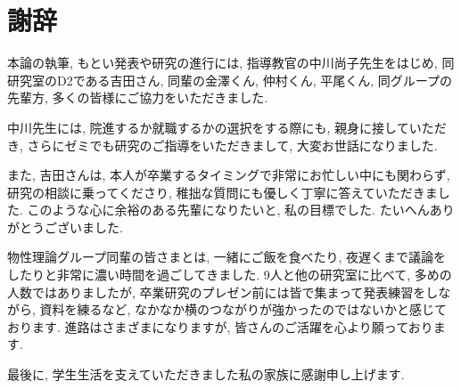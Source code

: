 \chapter*{謝辞}

本論の執筆, もとい発表や研究の進行には, 指導教官の中川尚子先生をはじめ, 同研究室のD2である吉田さん, 同輩の金澤くん, 仲村くん, 平尾くん, 同グループの先輩方, 多くの皆様にご協力をいただきました. 

中川先生には, 院進するか就職するかの選択をする際にも, 親身に接していただき, さらにゼミでも研究のご指導をいただきまして, 大変お世話になりました. 

また, 吉田さんは, 本人が卒業するタイミングで非常にお忙しい中にも関わらず, 研究の相談に乗ってくださり, 稚拙な質問にも優しく丁寧に答えていただきました. このような心に余裕のある先輩になりたいと, 私の目標でした. たいへんありがとうございました. 

物性理論グループ同輩の皆さまとは, 一緒にご飯を食べたり, 夜遅くまで議論をしたりと非常に濃い時間を過ごしてきました. 9人と他の研究室に比べて, 多めの人数ではありましたが, 卒業研究のプレゼン前には皆で集まって発表練習をしながら, 資料を練るなど, なかなか横のつながりが強かったのではないかと感じております. 進路はさまざまになりますが, 皆さんのご活躍を心より願っております.

最後に, 学生生活を支えていただきました私の家族に感謝申し上げます.

